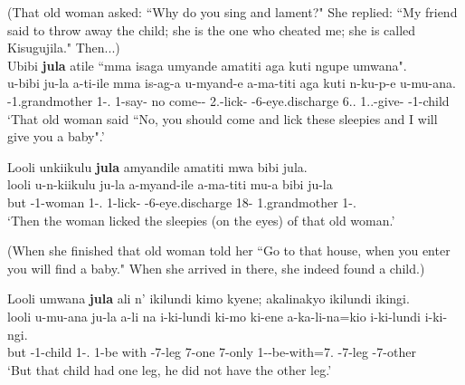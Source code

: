 \documentclass[output=paper]{langscibook}
\begin{document}
\ea
\label{bkm:Ref122078941}(That old woman asked: ``Why do you sing and lament?" She replied: ``My friend said to throw away the child; she is the one who cheated me; she is called Kisugujila." Then...)\\

\ea
 Ubibi \textbf{jula} atile ``mma isaga umyande amatiti aga kuti ngupe umwana".\\
\gll
u-bibi  ju-la  a-ti-ile  mma  is-ag-a  u-myand-e  a-ma-titi  aga  kuti  n-ku-p-e  u-mu-ana.\\
\AUG{}-1.grandmother  1-\DEM.\DIST{}  1\SM{}-say-\PFV{}  no  come-\HAB{}-\IMP{}  2\SG.\SM{}-lick-\SBJV{} \AUG{}-6-eye.discharge  6.\DEM.\PROX{}  \COMP{}  1\SG.\SG.\OM{}-give-\SBJV{}  \AUG{}-1-child\\
\glt ‘That old woman said ``No, you should come and lick these sleepies and I will give you a baby".’

\ex
Looli unkiikulu \textbf{jula} amyandile amatiti mwa bibi jula.\\
\gll
looli  u-n-kiikulu  ju-la  a-myand-ile  a-ma-titi  mu-a  bibi  ju-la\\
but  \AUG{}-1-woman  1-\DEM.\DIST{}  1\SM{}-lick-\PFV{}  \AUG{}-6-eye.discharge  18-\CONN{} 1.grandmother  1-\DEM.\DIST{}\\
\glt ‘Then the woman licked the sleepies (on the eyes) of that old woman.’

\z

(When she finished that old woman told her ``Go to that house, when you enter you will find a baby." When she arrived in there, she indeed found a child.)\\

\begin{xlist}
\setcounter{xnumii}{2}
\ex
Looli umwana \textbf{jula} ali n’ ikilundi kimo kyene; akalinakyo ikilundi ikingi.\\
\gll
looli  u-mu-ana  ju-la  a-li  na  i-ki-lundi  ki-mo  ki-ene a-ka-li-na=kio  i-ki-lundi  i-ki-ngi.\\
but  \AUG{}-1-child  1-\DEM.\DIST{}  1\SM{}-be  with  \AUG{}-7-leg  7-one  7-only  1\SM-\NEG-{}be-with=7.\PRO{}  \AUG{}-7-leg  \AUG{}-7-other\\
\glt ‘But that child had one leg, he did not have the other leg.'

\end{xlist}
\z
\end{document}
